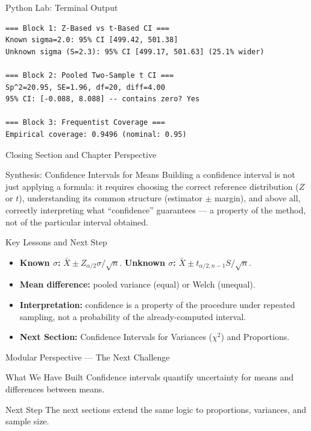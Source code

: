 \documentclass[aspectratio=169,xcolor={dvipsnames,table}]{beamer}
\begin{document}
\begin{frame}[fragile]{Python Lab: Terminal Output}
	\vspace{-0.1cm}
	\begin{block}{}
		\fontsize{4pt}{5pt}\selectfont
		\begin{verbatim}
=== Block 1: Z-Based vs t-Based CI ===
Known sigma=2.0: 95% CI [499.42, 501.38]
Unknown sigma (S=2.3): 95% CI [499.17, 501.63] (25.1% wider)

=== Block 2: Pooled Two-Sample t CI ===
Sp^2=20.95, SE=1.96, df=20, diff=4.00
95% CI: [-0.088, 8.088] -- contains zero? Yes

=== Block 3: Frequentist Coverage ===
Empirical coverage: 0.9496 (nominal: 0.95)
		\end{verbatim}
	\end{block}
\end{frame}


\begin{frame}{Closing Section and Chapter Perspective}
	\vspace{-0.2cm}
	\begin{block}{Synthesis: Confidence Intervals for Means}
		\scriptsize
		Building a confidence interval is not just applying a formula: it requires choosing the correct reference distribution ($Z$ or $t$), understanding its common structure (estimator $\pm$ margin), and above all, correctly interpreting what ``confidence'' guarantees --- a property of the method, not of the particular interval obtained.
	\end{block}
	\vspace{0.05cm}
	\pause
	\begin{alertblock}{Key Lessons and Next Step}
		\begin{itemize}\itemsep=0.05cm
			\item \textbf{Known $\sigma$:} $\bar X \pm Z_{\alpha/2}\sigma/\sqrt n$. \textbf{Unknown $\sigma$:} $\bar X \pm t_{\alpha/2,n-1}S/\sqrt n$.
			\item \textbf{Mean difference:} pooled variance (equal) or Welch (unequal).
			\item \textbf{Interpretation:} confidence is a property of the procedure under repeated sampling, not a probability of the already-computed interval.
			\item \textbf{Next Section:} \textcolor{TecRojo}{Confidence Intervals for Variances ($\chi^2$) and Proportions}.
		\end{itemize}
	\end{alertblock}
\end{frame}

\begin{frame}{Modular Perspective --- The Next Challenge}
  \small
  \begin{block}{What We Have Built}
    Confidence intervals quantify uncertainty for means and differences between means.
  \end{block}
  \pause
  \begin{alertblock}{Next Step}
    The next sections extend the same logic to proportions, variances, and sample size.
  \end{alertblock}
\end{frame}
\end{document}
